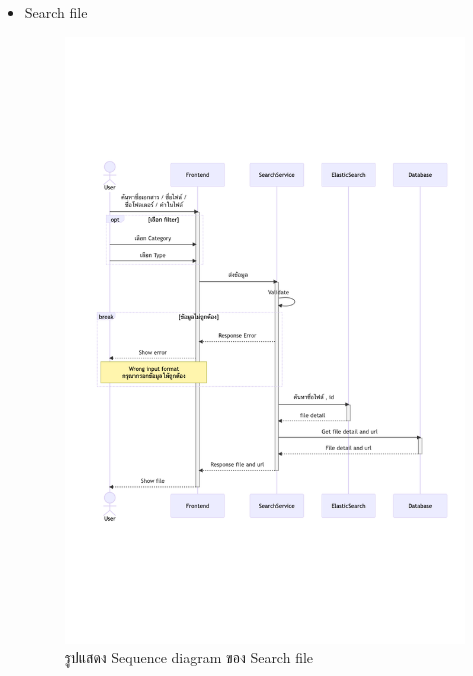 \documentclass[12pt,oneside,openright,a4paper]{cpe-thai-project}
\begin{document}
\begin{itemize}
    \newpage
    \item Search file \\
    \begin{figure}[!ht]\centering
        \includegraphics[width=13cm, trim={0 7cm 0 7cm},clip]{./assets/sequence-diagram/search-file.png}
        \caption{รูปแสดง Sequence diagram ของ Search file}\label{fig:sqSearchFile}
    \end{figure}


\end{itemize}
\end{document}
